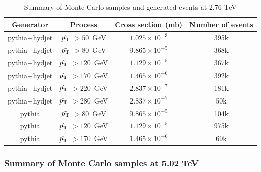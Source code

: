 \begin{table}[htbp]
\begin{center} 
\caption{Summary of Monte Carlo samples and generated events at 2.76 TeV}

\label{mc_stats_276} \begin{tabular}{|c|c|c|c|}
\hline
Generator & Process & Cross section (mb) & Number of events \\
\hline
{\sc pythia+hydjet} & $\hat{p_{\rm T}}$ $> 50$~GeV & $1.025\times 10^{-3}$ & 395k  \\
{\sc pythia+hydjet} & $\hat{p_{\rm T}}$ $> 80$~GeV & $9.865\times 10^{-5}$ & 368k  \\
{\sc pythia+hydjet} & $\hat{p_{\rm T}}$ $> 120$~GeV & $1.129 \times 10^{-5}$ & 367k \\
{\sc pythia+hydjet} & $\hat{p_{\rm T}}$ $> 170$~GeV & $1.465 \times 10^{-6}$ & 392k \\
{\sc pythia+hydjet} & $\hat{p_{\rm T}}$ $> 220$~GeV & $2.837\times 10^{-7}$ & 181k \\
{\sc pythia+hydjet} & $\hat{p_{\rm T}}$ $> 280$~GeV & $2.837\times 10^{-7}$ & 50k \\
\hline
{\sc pythia} & $\hat{p_{\rm T}}$ $> 80$~GeV & $9.865\times 10^{-5}$ & 104k  \\
{\sc pythia} & $\hat{p_{\rm T}}$ $> 120$~GeV & $1.129 \times 10^{-5}$ & 975k \\
{\sc pythia} & $\hat{p_{\rm T}}$ $> 170$~GeV & $1.465 \times 10^{-6}$ & 69k \\

\hline
\end{tabular}
\end{center} 
\end{table} 


\clearpage

\subsubsection{Summary of Monte Carlo samples at 5.02 TeV}

